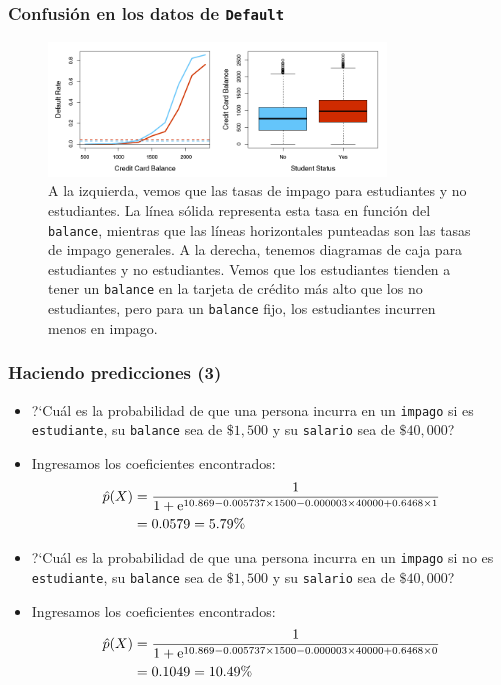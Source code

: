 \documentclass[usenames,dvipsnames]{beamer} %
\newcommand\vari[1]{\textcolor{BrickRed}{\texttt{#1}}}
\begin{document}
\begin{frame}\frametitle{Confusi\'on en los datos de \vari{Default}}
\begin{figure}
	\centering
	\includegraphics[width=0.8\textwidth]{images/islr/fig_4_3.png}
	\caption{A la izquierda, vemos que las tasas de impago para \textcolor{BrickRed}{estudiantes} y \textcolor{Cerulean}{no estudiantes}. La l\'inea s\'olida representa esta tasa en funci\'on del \vari{balance}, mientras que las l\'ineas horizontales punteadas son las tasas de impago generales. A la derecha, tenemos diagramas de caja para \textcolor{BrickRed}{estudiantes} y \textcolor{Cerulean}{no estudiantes}. Vemos que los estudiantes tienden a tener un \vari{balance} en la tarjeta de cr\'edito m\'as alto que los no estudiantes, pero para un \vari{balance} fijo, los estudiantes incurren menos en impago.}
	\label{fig:islr_4-3}
\end{figure}
\end{frame}

\begin{frame}\frametitle{Haciendo predicciones (3)}
\begin{itemize}
	\item ?`Cu\'al es la probabilidad de que una persona incurra en un \vari{impago} si es \vari{estudiante}, su \vari{balance} sea de $\$1,500$ y su \vari{salario} sea de $\$40,000$?
	\item Ingresamos los coeficientes encontrados:
	\begin{align*}
	\hat{p}(X)&=\frac{1}{1+\rm{e}^{10.869-0.005737\times 1500-0.000003\times40000+0.6468\times 1}}\\
	&= 0.0579=5.79\%
	\end{align*}
	\item ?`Cu\'al es la probabilidad de que una persona incurra en un \vari{impago} si no es \vari{estudiante}, su \vari{balance} sea de $\$1,500$ y su \vari{salario} sea de $\$40,000$?
	\item Ingresamos los coeficientes encontrados:
	\begin{align*}
	\hat{p}(X)&=\frac{1}{1+\rm{e}^{10.869-0.005737\times 1500-0.000003\times40000+0.6468\times 0}}\\
	&= 0.1049=10.49\%
	\end{align*}
\end{itemize}
\end{frame}
\end{document}
